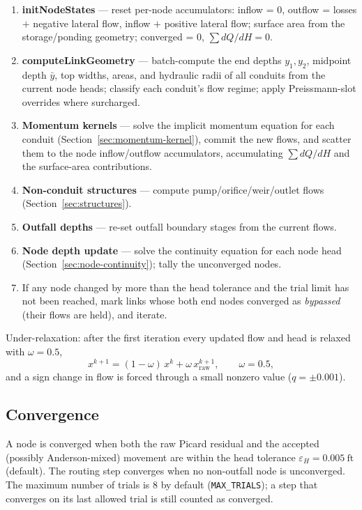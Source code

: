 \documentclass[11pt,a4paper]{article}
\newcommand{\ft}{\mathrm{ft}}
\begin{document}
\begin{enumerate}[nosep]
  \item \textbf{initNodeStates} --- reset per-node accumulators: inflow = 0,
        outflow = losses $+$ negative lateral flow, inflow $+$ positive lateral
        flow; surface area from the storage/ponding geometry; converged = 0,
        $\sum dQ/dH = 0$.
  \item \textbf{computeLinkGeometry} --- batch-compute the end depths
        $y_1, y_2$, midpoint depth $\bar y$, top widths, areas, and hydraulic
        radii of all conduits from the current node heads; classify each
        conduit's flow regime; apply Preissmann-slot overrides where
        surcharged.
  \item \textbf{Momentum kernels} --- solve the implicit momentum equation for
        each conduit (Section~\ref{sec:momentum-kernel}), commit the new
        flows, and scatter them to the node inflow/outflow accumulators,
        accumulating $\sum dQ/dH$ and the surface-area contributions.
  \item \textbf{Non-conduit structures} --- compute pump/orifice/weir/outlet
        flows (Section~\ref{sec:structures}).
  \item \textbf{Outfall depths} --- re-set outfall boundary stages from the
        current flows.
  \item \textbf{Node depth update} --- solve the continuity equation for each
        node head (Section~\ref{sec:node-continuity}); tally the unconverged
        nodes.
  \item If any node changed by more than the head tolerance and the trial limit
        has not been reached, mark links whose both end nodes converged as
        \emph{bypassed} (their flows are held), and iterate.
\end{enumerate}

Under-relaxation: after the first iteration every updated flow and head is
relaxed with $\omega = 0.5$,
\begin{equation}
  x^{k+1} = (1-\omega)\,x^{k} + \omega\,x^{k+1}_{\mathrm{raw}},
  \qquad \omega = 0.5,
\end{equation}
and a sign change in flow is forced through a small nonzero value
($q = \pm 0.001$).

\subsection{Convergence}

A node is converged when both the raw Picard residual and the accepted (possibly
Anderson-mixed) movement are within the head tolerance $\varepsilon_H = 0.005\
\ft$ (default). The routing step converges when no non-outfall node is
unconverged. The maximum number of trials is 8 by default
(\texttt{MAX\_TRIALS}); a step that converges on its last allowed trial is still
counted as converged.
\end{document}
